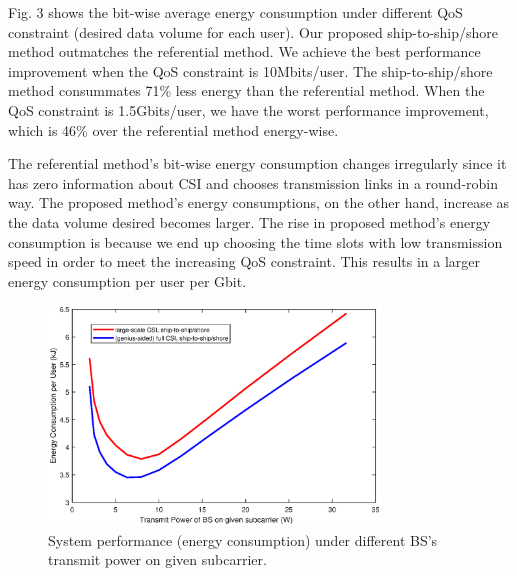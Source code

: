 \documentclass[conference]{IEEEtran}
\begin{document}
 
 
 Fig. 3 shows the bit-wise average energy consumption under different QoS constraint (desired data volume for each user).
 Our proposed ship-to-ship/shore method outmatches the referential method. We achieve the best performance improvement when the QoS constraint is 10Mbits/user. The ship-to-ship/shore method consummates 71\% less energy than the referential method. When the QoS constraint is 1.5Gbits/user, we have the worst performance improvement, which is 46\% over the referential method energy-wise.
 
 The referential method's bit-wise energy consumption changes irregularly since it has zero information about CSI and chooses transmission links in a round-robin way. The proposed method's energy consumptions, on the other hand, increase as the data volume desired becomes larger. The rise in proposed method's energy consumption is because we end up choosing the time slots with low transmission speed in order to meet the increasing QoS constraint. This results in a larger energy consumption per user per Gbit. 
 
 
 
 \begin{figure} [htb]
 \begin{center}
 \includegraphics*[width=8.8cm]{snrs.eps}
 \end{center}
 \vspace*{-4mm} 
 \caption{System performance (energy consumption) under different BS's transmit power on given subcarrier.}\label{fig:5}
 \vspace*{-2mm} 
 \end{figure}
\end{document}
